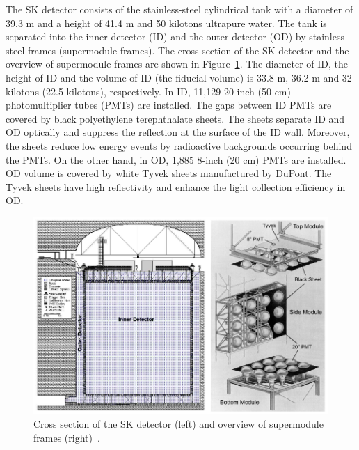 \hs The SK detector consists of the stainless-steel cylindrical tank with a diameter of 39.3 m and a height of 41.4 m and 50 kilotons ultrapure water.
The tank is separated into the inner detector (ID) and the outer detector (OD) by stainless-steel frames (supermodule frames).
The cross section of the SK detector and the overview of supermodule frames are shown in Figure~\ref{SK_SK_SM}.
The diameter of ID, the height of ID and the volume of ID (the fiducial volume) is 33.8 m, 36.2 m and 32 kilotons (22.5 kilotons), respectively.
In ID, 11,129 20-inch (50 cm) photomultiplier tubes (PMTs) are installed.
The gaps between ID PMTs are covered by black polyethylene terephthalate sheets.
The sheets separate ID and OD optically and suppress the reflection at the surface of the ID wall.
Moreover, the sheets reduce low energy events by radioactive backgrounds occurring behind the PMTs.
On the other hand, in OD, 1,885 8-inch (20 cm) PMTs are installed.
OD volume is covered by white Tyvek sheets manufactured by DuPont.
The Tyvek sheets have high reflectivity and enhance the light collection efficiency in OD.

\begin{figure}[tbp]
	\centering
	\includegraphics[width=14cm]{Figures/SK/SK_SM}
	\caption[Cross section of the SK detector and overview of supermodule frames]{\label{SK_SK_SM} Cross section of the SK detector (left) and overview of supermodule frames (right)~\cite{2003Fukuda}.}
\end{figure}

